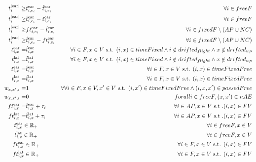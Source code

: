 \documentclass[../thesis.tex]{subfiles}
\begin{document}
{\begin{align}
t^\text{|ear|}_i\geq& t^\text{ear}_{i,e_i} - \hat t^\text{ear}_{i,e_i} &\forall i\in freeF\\
t^\text{|ear|}_i\geq& \hat t^\text{ear}_{i,e_i} - t^\text{ear}_{i,e_i} &\forall i\in freeF\\
t^\text{|ear|}_i\geq& ft^\text{ear}_{i,e_i} - \hat t^\text{ear}_{i,e_i} &\forall i\in fixedF\setminus (AP\cup NC)\\
t^\text{|ear|}_i\geq& \hat t^\text{ear}_{i,e_i} - ft^\text{ear}_{i,e_i} &\forall i\in fixedF\setminus (AP\cup NC)\\
t^\text{ear}_{i,x} =& \hat t^\text{ear}_{i,x}& \forall i\in F, x\in V\text { s.t. } (i,x)\in timeFixed \land i\notin drifted_{flight}\land x\notin drifted_{wp} \\
t^\text{lat}_{i,x} =& \hat t^\text{lat}_{i,x}& \forall i\in F, x\in V\text { s.t. } (i,x)\in timeFixed \land i\notin drifted_{flight}\land x\notin drifted_{wp} \\
t^\text{ear}_{i,x} =& \hat t^\text{ear}_{i,x}& \forall i\in F, x\in V\text { s.t. } (i,x)\in timeFixedFree \\
t^\text{lat}_{i,x} =& \hat t^\text{lat}_{i,x}& \forall i\in F, x\in V\text { s.t. } (i,x)\in timeFixedFree \\
w_{x,x',i} =& 1 &\forall  \forall i\in F, x\in V,x'\in V\text { s.t. } (i,x')\in timeFixedFree \land (i,x,x')\in passedFree\\
w_{x,x',i}=&0&forall i\in freeF, (x,x')\in nAE\\
ft^\text{ear}_{i,x} =& \hat t^\text{ear}_{i,x} + \tau_i &\forall i\in AP, x\in V \text{ s.t .} (i,x)\in FV\\ 
ft^\text{lat}_{i,x} =& \hat t^\text{lat}_{i,x} + \tau_i &\forall i\in AP, x\in V\text{ s.t .} (i,x)\in FV\\ 
%
%
%
%
&\mathclap{t^\text{ear}_{i,x} \in \mathbb{R}_+}&\forall i\in freeF,x\in V \nonumber \\
&\mathclap{t^\text{lat}_{i,x} \in \mathbb{R}_+}&\forall i\in freeF,x\in V \nonumber \\
&\mathclap{ft^\text{ear}_{i,x} \in \mathbb{R}_+}&\forall i\in F,x\in V\text{ s.t. } (i,x)\in FV \nonumber \\
&\mathclap{ft^\text{lat}_{i,x} \in \mathbb{R}_+}&\forall i\in F,x\in V\text{ s.t. } (i,x)\in FV \nonumber \\

\end{align}}
\end{document}
